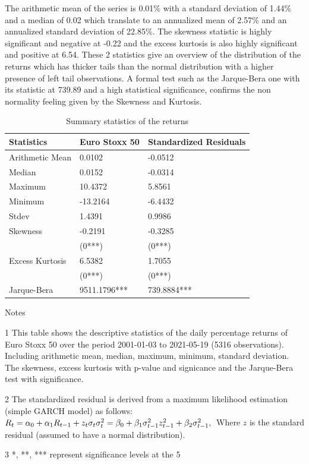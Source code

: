 \documentclass[a4paper, twoside]{templates/ociamthesis}
\begin{document}
\noindent The arithmetic mean of the series is 0.01\% with a standard deviation of 1.44\% and a median of 0.02 which translate to an annualized mean of 2.57\% and an annualized standard deviation of 22.85\%. The skewness statistic is highly significant and negative at -0.22 and the excess kurtosis is also highly significant and positive at 6.54. These 2 statistics give an overview of the distribution of the returns which has thicker tails than the normal distribution with a higher presence of left tail observations. A formal test such as the Jarque-Bera one with its statistic at 739.89 and a high statistical significance, confirms the non normality feeling given by the Skewness and Kurtosis.~\\

\begin{table}[h!]

\caption{\label{tab:dsTable}Summary statistics of the returns}
\centering
\begin{threeparttable}
\begin{tabular}[t]{lll}
\toprule
Statistics & Euro Stoxx 50 & Standardized Residuals\\
\midrule
Arithmetic Mean & 0.0102 & -0.0512\\
Median & 0.0152 & -0.0314\\
Maximum & 10.4372 & 5.8561\\
Minimum & -13.2164 & -6.4432\\
Stdev & 1.4391 & 0.9986\\
\addlinespace
Skewness & -0.2191 & -0.3285\\
 & (0***) & (0***)\\
Excess Kurtosis & 6.5382 & 1.7055\\
 & (0***) & (0***)\\
Jarque-Bera & 9511.1796*** & 739.8884***\\
\bottomrule
\end{tabular}
\begin{tablenotes}
\item Notes
\item[1] This table shows the descriptive statistics of the daily percentage returns of Euro Stoxx 50 over the period 2001-01-03 to 2021-05-19 (5316 observations). Including arithmetic mean, median, maximum, minimum, standard deviation. The skewness, excess kurtosis with p-value and signicance and the Jarque-Bera test with significance.
\item[2] The standardized residual is derived from a maximum likelihood estimation (simple GARCH model) as follows:  $ R_t=\alpha_0+\alpha_1 R_{t-1}+z_t \sigma_t \\ \sigma_t^2=\beta_0+\beta_1 \sigma_{t-1}^2 z_{t-1}^2+\beta_2 \sigma_{t-1}^2, \\$ Where $z$ is the standard residual (assumed to have a normal distribution).
\item[3] *, **, *** represent significance levels at the 5%
\end{tablenotes}
\end{threeparttable}
\end{table}
\end{document}
